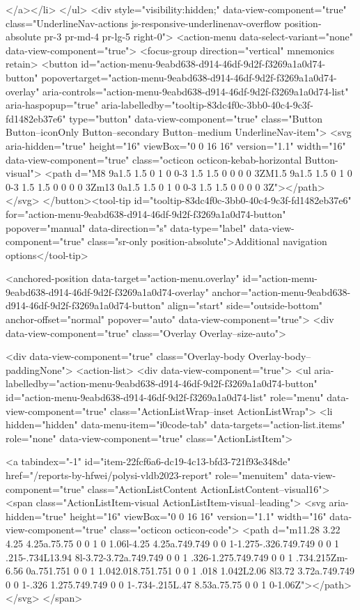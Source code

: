 {{    
</a></li>
</ul>
    <div style="visibility:hidden;" data-view-component="true" class="UnderlineNav-actions js-responsive-underlinenav-overflow position-absolute pr-3 pr-md-4 pr-lg-5 right-0">      <action-menu data-select-variant="none" data-view-component="true">
  <focus-group direction="vertical" mnemonics retain>
    <button id="action-menu-9eabd638-d914-46df-9d2f-f3269a1a0d74-button" popovertarget="action-menu-9eabd638-d914-46df-9d2f-f3269a1a0d74-overlay" aria-controls="action-menu-9eabd638-d914-46df-9d2f-f3269a1a0d74-list" aria-haspopup="true" aria-labelledby="tooltip-83dc4f0c-3bb0-40c4-9c3f-fd1482eb37e6" type="button" data-view-component="true" class="Button Button--iconOnly Button--secondary Button--medium UnderlineNav-item">  <svg aria-hidden="true" height="16" viewBox="0 0 16 16" version="1.1" width="16" data-view-component="true" class="octicon octicon-kebab-horizontal Button-visual">
    <path d="M8 9a1.5 1.5 0 1 0 0-3 1.5 1.5 0 0 0 0 3ZM1.5 9a1.5 1.5 0 1 0 0-3 1.5 1.5 0 0 0 0 3Zm13 0a1.5 1.5 0 1 0 0-3 1.5 1.5 0 0 0 0 3Z"></path>
</svg>
</button><tool-tip id="tooltip-83dc4f0c-3bb0-40c4-9c3f-fd1482eb37e6" for="action-menu-9eabd638-d914-46df-9d2f-f3269a1a0d74-button" popover="manual" data-direction="s" data-type="label" data-view-component="true" class="sr-only position-absolute">Additional navigation options</tool-tip>


<anchored-position data-target="action-menu.overlay" id="action-menu-9eabd638-d914-46df-9d2f-f3269a1a0d74-overlay" anchor="action-menu-9eabd638-d914-46df-9d2f-f3269a1a0d74-button" align="start" side="outside-bottom" anchor-offset="normal" popover="auto" data-view-component="true">
  <div data-view-component="true" class="Overlay Overlay--size-auto">
    
      <div data-view-component="true" class="Overlay-body Overlay-body--paddingNone">          <action-list>
  <div data-view-component="true">
    <ul aria-labelledby="action-menu-9eabd638-d914-46df-9d2f-f3269a1a0d74-button" id="action-menu-9eabd638-d914-46df-9d2f-f3269a1a0d74-list" role="menu" data-view-component="true" class="ActionListWrap--inset ActionListWrap">
        <li hidden="hidden" data-menu-item="i0code-tab" data-targets="action-list.items" role="none" data-view-component="true" class="ActionListItem">
    
    
    <a tabindex="-1" id="item-22fcf6a6-dc19-4c13-bfd3-721f93e348de" href="/reports-by-hfwei/polysi-vldb2023-report" role="menuitem" data-view-component="true" class="ActionListContent ActionListContent--visual16">
        <span class="ActionListItem-visual ActionListItem-visual--leading">
          <svg aria-hidden="true" height="16" viewBox="0 0 16 16" version="1.1" width="16" data-view-component="true" class="octicon octicon-code">
    <path d="m11.28 3.22 4.25 4.25a.75.75 0 0 1 0 1.06l-4.25 4.25a.749.749 0 0 1-1.275-.326.749.749 0 0 1 .215-.734L13.94 8l-3.72-3.72a.749.749 0 0 1 .326-1.275.749.749 0 0 1 .734.215Zm-6.56 0a.751.751 0 0 1 1.042.018.751.751 0 0 1 .018 1.042L2.06 8l3.72 3.72a.749.749 0 0 1-.326 1.275.749.749 0 0 1-.734-.215L.47 8.53a.75.75 0 0 1 0-1.06Z"></path>
</svg>
        </span>
      
}}
